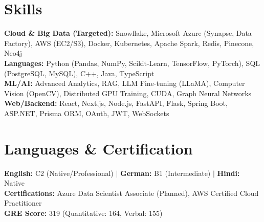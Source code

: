 \documentclass[10pt,a4paper]{article}
\begin{document}
\section{Skills}
\begin{itemize}[label={}]
    \small{\item{
     \textbf{Cloud \& Big Data (Targeted):}{ Snowflake, Microsoft Azure (Synapse, Data Factory), AWS (EC2/S3), Docker, Kubernetes, Apache Spark, Redis, Pinecone, Neo4j} \\
     \textbf{Languages:}{ Python (Pandas, NumPy, Scikit-Learn, TensorFlow, PyTorch), SQL (PostgreSQL, MySQL), C++, Java, TypeScript} \\
     \textbf{ML/AI:}{ Advanced Analytics, RAG, LLM Fine-tuning (LLaMA), Computer Vision (OpenCV), Distributed GPU Training, CUDA, Graph Neural Networks} \\
     \textbf{Web/Backend:}{ React, Next.js, Node.js, FastAPI, Flask, Spring Boot, ASP.NET, Prisma ORM, OAuth, JWT, WebSockets}
    }}
\end{itemize}

\section{Languages \& Certification}
\begin{itemize}[label={}]
    \small{\item{
     \textbf{English:}{ C2 (Native/Professional)} $|$ \textbf{German:}{ B1 (Intermediate)} $|$ \textbf{Hindi:}{ Native} \\
     \textbf{Certifications:}{ Azure Data Scientist Associate (Planned), AWS Certified Cloud Practitioner} \\
     \textbf{GRE Score:}{ 319 (Quantitative: 164, Verbal: 155)}
    }}
\end{itemize}
\end{document}
